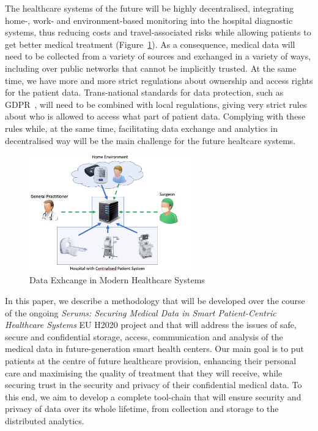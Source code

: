 \noindent
The healthcare systems of the future will be highly decentralised, integrating home-, work- and environment-based monitoring into the hospital diagnostic systems, thus reducing costs and travel-associated risks while allowing patients to get better medical treatment (Figure~\ref{fig:dataExch}). As a consequence, medical data will need to be collected from a variety of sources and exchanged in a variety of ways, including over public networks that cannot be implicitly trusted. At the same time, we have more and more strict regulations about ownership and access rights for the patient data. Trans-national standards for data protection, such as GDPR~\cite{gdpr}, will need to be combined with local regulations, giving very strict rules about who is allowed to access what part of patient data. Complying with these rules while, at the same time, facilitating data exchange and analytics in decentralised way will be the main challenge for the future healtcare systems.

\begin{figure}[ht!]
    \centering
    \includegraphics[width=70mm]{images/DataExchange.png}
    \caption{Data Exhcange in Modern Healthcare Systems}
    \label{fig:dataExch}
\end{figure}

In this paper, we describe a methodology that will be developed over the course of the ongoing \emph{Serums: Securing Medical Data in Smart Patient-Centric Healthcare Systems} EU H2020 project and that will address the issues of safe, secure and confidential storage, access, communication and analysis of the medical data in future-generation smart health centers. Our main goal is to put patients at the centre of future healthcare provision, enhancing their personal care and maximising the quality of treatment that they will receive, while securing trust in the security and privacy of their confidential medical data. To this end, we aim to develop a complete tool-chain that will ensure security and privacy of data over its whole lifetime, from collection and storage to the distributed analytics.

